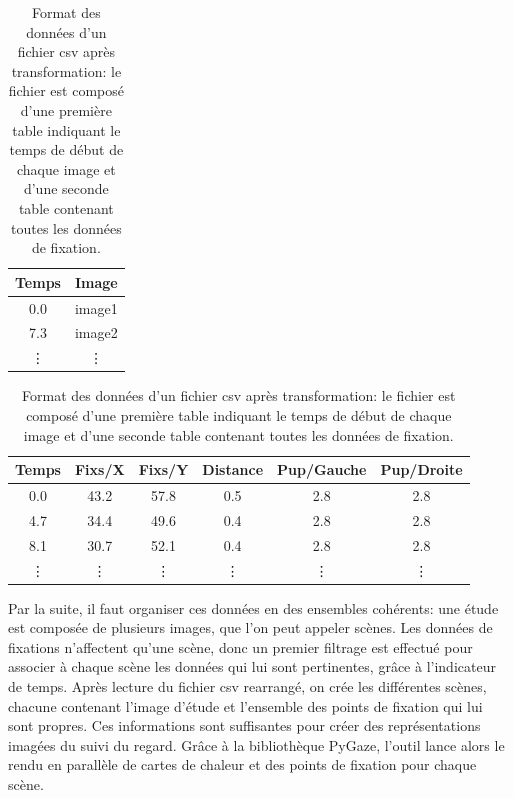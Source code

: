 \documentclass[hidelinks,12pt]{article}
\begin{document}
\bigskip
\begin{table}[htpb]
  \begin{adjustwidth}{0.05\textwidth}{0cm}
    \begin{tabular}{|c||c|}
      \hline
      Temps  & Image  \\
      \hline
      0.0    & image1 \\
      7.3    & image2 \\
      \vdots & \vdots \\
      \hline
    \end{tabular}
    \newline
    \begin{tabular}{|c||c|c|c|c|c|}
      \hline
      Temps  & Fixs/X & Fixs/Y & Distance & Pup/Gauche & Pup/Droite \\
      \hline
      0.0    & 43.2   & 57.8   & 0.5      & 2.8        & 2.8        \\
      4.7    & 34.4   & 49.6   & 0.4      & 2.8        & 2.8        \\
      8.1    & 30.7   & 52.1   & 0.4      & 2.8        & 2.8        \\
      \vdots & \vdots & \vdots & \vdots   & \vdots     & \vdots     \\
      \hline
    \end{tabular}
  \end{adjustwidth}
  \caption{Format des données d'un fichier csv après transformation: le fichier
    est composé d'une première table indiquant le temps de début de chaque
    image et d'une seconde table contenant toutes les données de fixation.}
  \label{tab:format-csv}
\end{table}

Par la suite, il faut organiser ces données en des ensembles cohérents: une
étude est composée de plusieurs images, que l'on peut appeler scènes. Les
données de fixations n'affectent qu'une scène, donc un premier filtrage est
effectué pour associer à chaque scène les données qui lui sont pertinentes,
grâce à l'indicateur de temps. Après lecture du fichier csv rearrangé, on crée
les différentes scènes, chacune contenant l'image d'étude et l'ensemble des
points de fixation qui lui sont propres. Ces informations sont suffisantes pour
créer des représentations imagées du suivi du regard. Grâce à la bibliothèque
PyGaze, l'outil lance alors le rendu en parallèle de cartes de chaleur et des
points de fixation pour chaque scène.
\end{document}
